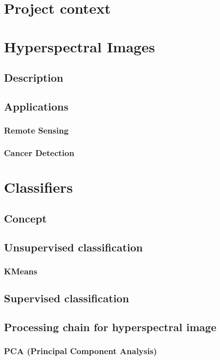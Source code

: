     \section{Project context}  
        \section{Hyperspectral Images}
         \subsection{Description}
         \subsection{Applications} 
         	\subsubsection{Remote Sensing} 
         	\subsubsection{Cancer Detection} 
         \section{Classifiers}
     		\subsection{Concept} 
            \subsection{Unsupervised 		classification}
               \subsubsection{KMeans} 
            \subsection{Supervised classification}
            \subsection{Processing chain for hyperspectral image}
               \subsubsection{PCA (Principal Component     Analysis)} 
